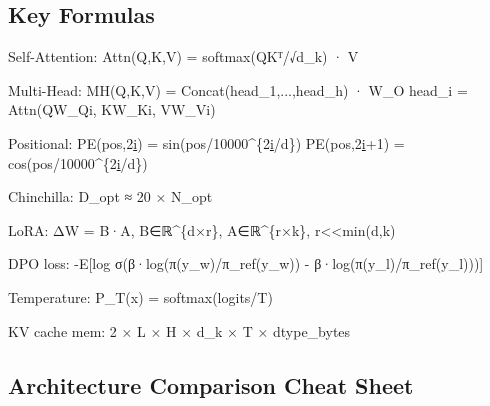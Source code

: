 \documentclass[11pt]{article}
\newenvironment{Shaded}{\begin{snugshade}}{\end{snugshade}}
\newcommand{\BuiltInTok}[1]{\textcolor[rgb]{0.50,0.55,0.55}{#1}}
\newcommand{\DecValTok}[1]{\textcolor[rgb]{0.96,0.45,0.00}{#1}}
\newcommand{\ErrorTok}[1]{\textcolor[rgb]{0.85,0.27,0.33}{\underline{#1}}}
\newcommand{\NormalTok}[1]{\textcolor[rgb]{0.81,0.81,0.76}{#1}}
\newcommand{\OperatorTok}[1]{\textcolor[rgb]{0.81,0.81,0.76}{#1}}
\begin{document}
\subsection{Key Formulas}\label{key-formulas}


\begin{Shaded}
\begin{Highlighting}[]
\NormalTok{Self}\OperatorTok{{-}}\NormalTok{Attention:     Attn(Q,K,V) }\OperatorTok{=}\NormalTok{ softmax(QKᵀ}\OperatorTok{/}\NormalTok{√d\_k) · V}

\NormalTok{Multi}\OperatorTok{{-}}\NormalTok{Head:         MH(Q,K,V) }\OperatorTok{=}\NormalTok{ Concat(head\_1,...,head\_h) · W\_O}
\NormalTok{                    head\_i }\OperatorTok{=}\NormalTok{ Attn(QW\_Qi, KW\_Ki, VW\_Vi)}

\NormalTok{Positional:         PE(pos,}\DecValTok{2}\ErrorTok{i}\NormalTok{)   }\OperatorTok{=}\NormalTok{ sin(pos}\OperatorTok{/}\DecValTok{10000}\OperatorTok{\^{}}\NormalTok{\{}\DecValTok{2}\ErrorTok{i}\OperatorTok{/}\NormalTok{d\})}
\NormalTok{                    PE(pos,}\DecValTok{2}\ErrorTok{i}\OperatorTok{+}\DecValTok{1}\NormalTok{) }\OperatorTok{=}\NormalTok{ cos(pos}\OperatorTok{/}\DecValTok{10000}\OperatorTok{\^{}}\NormalTok{\{}\DecValTok{2}\ErrorTok{i}\OperatorTok{/}\NormalTok{d\})}

\NormalTok{Chinchilla:         D\_opt ≈ }\DecValTok{20}\NormalTok{ × N\_opt}

\NormalTok{LoRA:               ΔW }\OperatorTok{=}\NormalTok{ B·A,  B∈ℝ}\OperatorTok{\^{}}\NormalTok{\{d×r\}, A∈ℝ}\OperatorTok{\^{}}\NormalTok{\{r×k\}, r}\OperatorTok{\textless{}\textless{}}\BuiltInTok{min}\NormalTok{(d,k)}

\NormalTok{DPO loss:           }\OperatorTok{{-}}\NormalTok{E[log σ(β·log(π(y\_w)}\OperatorTok{/}\NormalTok{π\_ref(y\_w)) }\OperatorTok{{-}}\NormalTok{ β·log(π(y\_l)}\OperatorTok{/}\NormalTok{π\_ref(y\_l)))]}

\NormalTok{Temperature:        P\_T(x) }\OperatorTok{=}\NormalTok{ softmax(logits}\OperatorTok{/}\NormalTok{T)}

\NormalTok{KV cache mem:       }\DecValTok{2}\NormalTok{ × L × H × d\_k × T × dtype\_bytes}
\end{Highlighting}
\end{Shaded}

\subsection{Architecture Comparison Cheat Sheet}\label{architecture-comparison-cheat-sheet}
\end{document}
